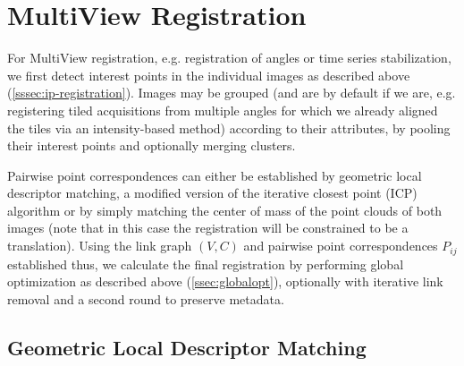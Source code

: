 \section{MultiView Registration}
\label{sec:mvr}

For MultiView registration, e.g. registration of angles or time series stabilization, we first detect interest points in the individual images as described above (\ref{sssec:ip-registration}). Images may be grouped (and are by default if we are, e.g. registering tiled acquisitions from multiple angles for which we already aligned the tiles via an intensity-based method) according to their attributes, by pooling their interest points and optionally merging clusters.

Pairwise point correspondences can either be established by geometric local descriptor matching, a modified version of the iterative closest point (ICP\cite{icp}) algorithm or by simply matching the center of mass of the point clouds of both images (note that in this case the registration will be constrained to be a translation). Using the link graph $(V,C)$ and pairwise point correspondences $P_{ij}$ established thus, we calculate the final registration by performing global optimization as described above (\ref{ssec:globalopt}), optionally with iterative link removal and a second round to preserve metadata.

\subsection*{Geometric Local Descriptor Matching}

